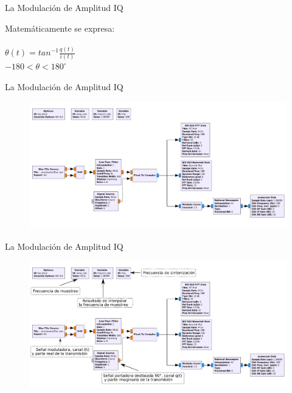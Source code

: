 \begin{frame}{La Modulación de Amplitud IQ}

Matemáticamente se expresa: \\\vspace{3mm}
\\ \vspace{2mm}
$\theta(t)=tan^{-1}\frac{q(t)}{i(t)}$\\\vspace{2mm}
$-180<\theta<180^{\circ}$

\end{frame}


\begin{frame}{La Modulación de Amplitud IQ}

\begin{figure}[H]
\centering
\vspace{-3mm}
\includegraphics[width=\textwidth]{parte3/lab15/pdf/lab15_2.pdf}
\end{figure}

\end{frame}

\begin{frame}{La Modulación de Amplitud IQ}

\begin{figure}[H]
\centering
\vspace{-3mm}
\includegraphics[width=\textwidth]{parte3/lab15/pdf/lab15_3.pdf}
\end{figure}

\end{frame}

